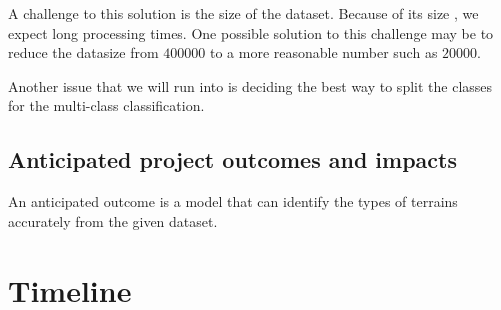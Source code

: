 \documentclass[11pt]{article}
\begin{document}
A challenge to this solution is the size of the dataset.
Because of its size , we expect long processing times.
One possible solution to this challenge may be to reduce the datasize
from \(\num{400000}\) to a more reasonable number such as
\(\num{20000}\).

Another issue that we will run into is deciding the best way to split the classes for the multi-class classification.

\subsection{Anticipated project outcomes and impacts}

An anticipated outcome is a model that can identify the types of terrains accurately from the given dataset.

\section{Timeline}

\printbibliography
\end{document}
